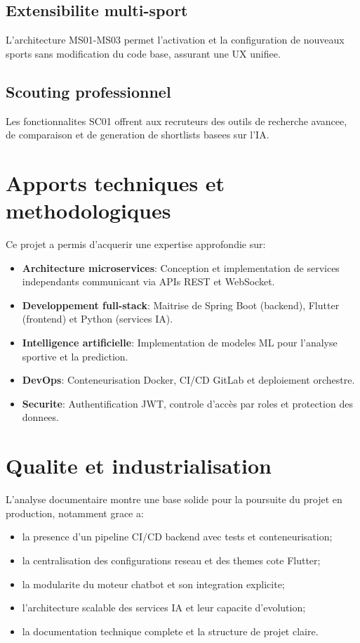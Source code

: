 \subsection*{Extensibilite multi-sport}
L'architecture MS01-MS03 permet l'activation et la configuration de nouveaux sports sans modification du code base, assurant une UX unifiee.

\subsection*{Scouting professionnel}
Les fonctionnalites SC01 offrent aux recruteurs des outils de recherche avancee, de comparaison et de generation de shortlists basees sur l'IA.

\section{Apports techniques et methodologiques}

Ce projet a permis d'acquerir une expertise approfondie sur:
\begin{itemize}
  \item \textbf{Architecture microservices}: Conception et implementation de services independants communicant via APIs REST et WebSocket.
  \item \textbf{Developpement full-stack}: Maitrise de Spring Boot (backend), Flutter (frontend) et Python (services IA).
  \item \textbf{Intelligence artificielle}: Implementation de modeles ML pour l'analyse sportive et la prediction.
  \item \textbf{DevOps}: Conteneurisation Docker, CI/CD GitLab et deploiement orchestre.
  \item \textbf{Securite}: Authentification JWT, controle d'accès par roles et protection des donnees.
\end{itemize}

\section{Qualite et industrialisation}

L'analyse documentaire montre une base solide pour la poursuite du projet en production, notamment grace a:
\begin{itemize}
  \item la presence d'un pipeline CI/CD backend avec tests et conteneurisation;
  \item la centralisation des configurations reseau et des themes cote Flutter;
  \item la modularite du moteur chatbot et son integration explicite;
  \item l'architecture scalable des services IA et leur capacite d'evolution;
  \item la documentation technique complete et la structure de projet claire.
\end{itemize}

